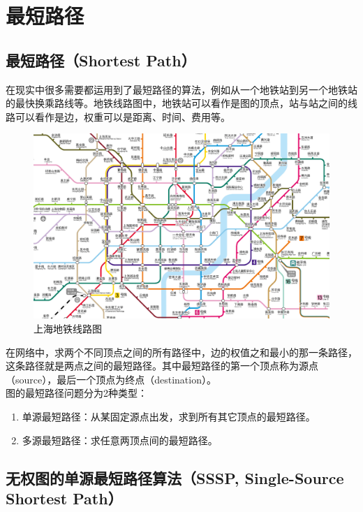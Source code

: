 \newpage

\section{最短路径}

\subsection{最短路径（Shortest Path）}

在现实中很多需要都运用到了最短路径的算法，例如从一个地铁站到另一个地铁站的最快换乘路线等。地铁线路图中，地铁站可以看作是图的顶点，站与站之间的线路可以看作是边，权重可以是距离、时间、费用等。 \\

\begin{figure}[H]
    \centering
    \includegraphics[scale=0.3]{img/C10/10-5/1.png}
    \caption{上海地铁线路图}
\end{figure}

在网络中，求两个不同顶点之间的所有路径中，边的权值之和最小的那一条路径，这条路径就是两点之间的最短路径。其中最短路径的第一个顶点称为源点（source），最后一个顶点为终点（destination）。 \\

图的最短路径问题分为2种类型：

\begin{enumerate}
    \item 单源最短路径：从某固定源点出发，求到所有其它顶点的最短路径。
    \item 多源最短路径：求任意两顶点间的最短路径。
\end{enumerate}

\subsection{无权图的单源最短路径算法（SSSP, Single-Source Shortest Path）}

